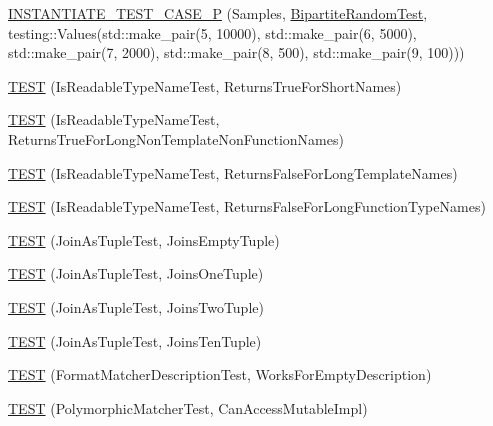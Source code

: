 \begin{DoxyCompactItemize}
\item 
\hyperlink{namespacetesting_1_1gmock__matchers__test_a857f48ffb1fc6f5ce61aec79b5c94da8}{I\+N\+S\+T\+A\+N\+T\+I\+A\+T\+E\+\_\+\+T\+E\+S\+T\+\_\+\+C\+A\+S\+E\+\_\+P} (Samples, \hyperlink{classtesting_1_1gmock__matchers__test_1_1BipartiteRandomTest}{Bipartite\+Random\+Test}, testing\+::\+Values(std\+::make\+\_\+pair(5, 10000), std\+::make\+\_\+pair(6, 5000), std\+::make\+\_\+pair(7, 2000), std\+::make\+\_\+pair(8, 500), std\+::make\+\_\+pair(9, 100)))
\item 
\hyperlink{namespacetesting_1_1gmock__matchers__test_aef0bf5f855b1e75c63ec45408b5a23ba}{T\+E\+ST} (Is\+Readable\+Type\+Name\+Test, Returns\+True\+For\+Short\+Names)
\item 
\hyperlink{namespacetesting_1_1gmock__matchers__test_a839515535e3e75d4f80ba6ae8f7347ec}{T\+E\+ST} (Is\+Readable\+Type\+Name\+Test, Returns\+True\+For\+Long\+Non\+Template\+Non\+Function\+Names)
\item 
\hyperlink{namespacetesting_1_1gmock__matchers__test_ad1630d47de9f4fcdc00ab4962eaeea05}{T\+E\+ST} (Is\+Readable\+Type\+Name\+Test, Returns\+False\+For\+Long\+Template\+Names)
\item 
\hyperlink{namespacetesting_1_1gmock__matchers__test_a30516b1c70e14132d1d87ab08b96aa2f}{T\+E\+ST} (Is\+Readable\+Type\+Name\+Test, Returns\+False\+For\+Long\+Function\+Type\+Names)
\item 
\hyperlink{namespacetesting_1_1gmock__matchers__test_aa633c0b7e0f0316c23bff10e9963f773}{T\+E\+ST} (Join\+As\+Tuple\+Test, Joins\+Empty\+Tuple)
\item 
\hyperlink{namespacetesting_1_1gmock__matchers__test_acaec7fcf41bb1cdf7124b443e7ab28e8}{T\+E\+ST} (Join\+As\+Tuple\+Test, Joins\+One\+Tuple)
\item 
\hyperlink{namespacetesting_1_1gmock__matchers__test_a0831a9160c5420fcd363e4a520f0fb61}{T\+E\+ST} (Join\+As\+Tuple\+Test, Joins\+Two\+Tuple)
\item 
\hyperlink{namespacetesting_1_1gmock__matchers__test_a56811b12ff298040a3d44dba0a2e4a8e}{T\+E\+ST} (Join\+As\+Tuple\+Test, Joins\+Ten\+Tuple)
\item 
\hyperlink{namespacetesting_1_1gmock__matchers__test_ae104f652fab7d1b3c3873f6987401481}{T\+E\+ST} (Format\+Matcher\+Description\+Test, Works\+For\+Empty\+Description)
\item 
\hyperlink{namespacetesting_1_1gmock__matchers__test_ae29925e94a9396fe3c7fab6efaff8d8a}{T\+E\+ST} (Polymorphic\+Matcher\+Test, Can\+Access\+Mutable\+Impl)
\item 

\end{DoxyCompactItemize}
